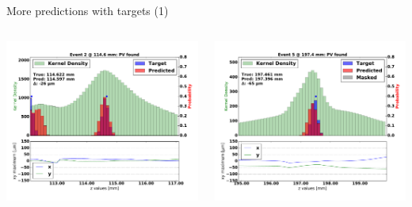 \begin{frame}{More predictions with targets (1)}
  \begin{columns}[c]
        \begin{center}
           \includegraphics[width=1\textwidth, trim=60 0 60 0]{images/07Jan19_AltCNN4Layer_D35_sp_12.pdf}
       \end{center}
       \begin{center}
           \includegraphics[width=1\textwidth, trim=60 0 60 0]{images/07Jan19_AltCNN4Layer_D35_sp_30.pdf}
       \end{center}
  \end{columns}
\end{frame}

